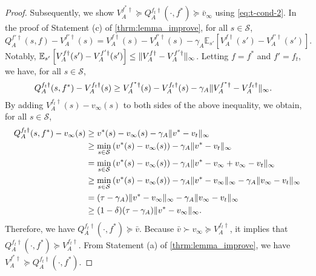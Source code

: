 \documentclass{acml}
\providecommand{\E}{\mathbb{E}} %
\DeclarePairedDelimiter{\norm}{\lVert}{\rVert}
\begin{document}
\begin{proof}
	Subsequently, we show $V_A^{f^*\dag} \succcurlyeq Q_A^{f_t\dag}(\cdot, f^*) \succcurlyeq \bar{v}_\infty$ using \cref{eq:t-cond-2}. 
	In the proof of Statement (c) of \cref{thrm:lemma_improve}, for all $s \in \mathcal{S}$,
	\begin{equation}
		Q_A^{f'\dag}(s,f) - V_A^{f'\dag}(s)
		= V_A^{f\dag}(s) - V_A^{f'\dag}(s) - \gamma_A\E_{s'}\left[V_A^{f\dag}(s') - V_A^{f'\dag}(s')\right] .
	\end{equation}
	Notably, $\E_{s'}\left[V_A^{f\dag}(s') - V_A^{f'\dag}(s')\right] \le \norm{V_A^{f\dag} - V_A^{f'\dag}}_{\infty}$. 
	Letting $f = f^*$ and $f' = f_t$, we have, for all $s \in \mathcal{S}$,
	\begin{align}
		Q_A^{f_t\dag}(s,f^*) - V_A^{f_t\dag}(s)
		&\ge V_A^{f^*\dag}(s) - V_A^{f_t\dag}(s) - \gamma_A \norm{V_A^{f^*\dag} - V_A^{f_t\dag}}_{\infty}.
	\end{align}
	By adding $V_A^{f_t\dag}(s) - v_{\infty}(s)$ to both sides of the above inequality, we obtain, for all $s \in \mathcal{S}$,
	\begin{subequations}
		\begin{align}
			Q_A^{f_t\dag}(s,f^*) - v_{\infty}(s)
			&\ge v^*(s) - v_{\infty}(s) - \gamma_A \norm{v^* - v_t}_{\infty} \\
			&\ge \min_{s \in \mathcal{S}} \left( v^*(s) - v_{\infty}(s)\right) - \gamma_A \norm{v^* - v_t}_{\infty} \\
			&= \min_{s \in \mathcal{S}} \left( v^*(s) - v_{\infty}(s)\right) - \gamma_A \norm{v^* - v_{\infty} + v_{\infty} - v_t}_{\infty} \\
			&\ge \min_{s \in \mathcal{S}} \left( v^*(s) - v_{\infty}(s)\right) - \gamma_A \norm{v^* - v_{\infty}}_\infty - \gamma_A \norm{v_{\infty} - v_t}_{\infty} \\
			&= (\tau - \gamma_A) \norm{v^* - v_{\infty}}_{\infty} - \gamma_A \norm{v_{\infty} - v_t}_{\infty} \\
			&\ge (1 - \delta)(\tau - \gamma_A) \norm{v^* - v_{\infty}}_{\infty}.
		\end{align}
	\end{subequations}
	Therefore, we have $Q_A^{f_t\dag}(\cdot, f^*) \succcurlyeq \bar{v}$.
	Because $\bar{v} \succ v_{\infty} \succcurlyeq V_A^{f_t\dag}$, it implies that $Q_A^{f_t\dag}(\cdot, f^*) \succcurlyeq V_A^{f_t\dag}$. From Statement (a) of \cref{thrm:lemma_improve}, we have $V_A^{f^*\dag} \succcurlyeq Q_A^{f_t\dag}(\cdot, f^*)$. 
	

\end{proof}
\end{document}
